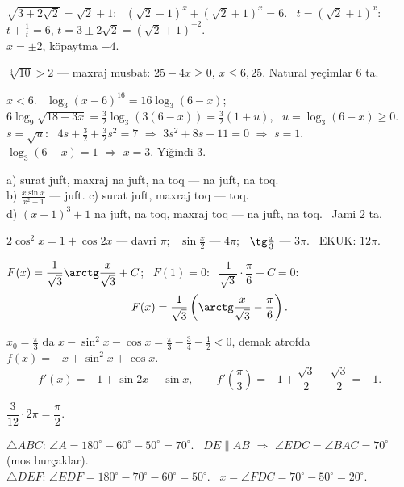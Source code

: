 $\sqrt{3+2\sqrt2}=\sqrt2+1$: \ $\left(\sqrt2-1\right)^x+\left(\sqrt2+1\right)^x=6$. \ $t=\left(\sqrt2+1\right)^x$: $t+\frac1t=6$, $t=3\pm2\sqrt2=\left(\sqrt2+1\right)^{\pm2}$.\\
$x=\pm2$, köpaytma $-4$.

$\sqrt[3]{10}>2$ — maxraj musbat: $25-4x\ge0$, $x\le6{,}25$. Natural yeçimlar $6$ ta.

$x<6$. \ $\log_3(x-6)^{16}=16\log_3(6-x)$; \ $6\log_9\sqrt{18-3x}=\frac32\log_3\left(3(6-x)\right)=\frac32\left(1+u\right)$, \ $u=\log_3(6-x)\ge0$.\\
$s=\sqrt u$: \ $4s+\frac32+\frac32s^2=7$ $\Rightarrow$ $3s^2+8s-11=0$ $\Rightarrow$ $s=1$.\\
$\log_3(6-x)=1$ $\Rightarrow$ $x=3$. Yiğindi $3$.

a) surat juft, maxraj na juft, na toq — na juft, na toq.\\
b) $\frac{x\sin x}{x^2+1}$ — juft. \quad c) surat juft, maxraj toq — toq.\\
d) $(x+1)^3+1$ na juft, na toq, maxraj toq — na juft, na toq. \ Jami $2$ ta.

$2\cos^2x=1+\cos2x$ — davri $\pi$; \ $\sin\frac x2$ — $4\pi$; \ $\tg\frac x3$ — $3\pi$. \ EKUK: $12\pi$.

$F(x)=\dfrac1{\sqrt3}\arctg\dfrac x{\sqrt3}+C$; \ $F(1)=0$: \ $\dfrac1{\sqrt3}\cdot\dfrac\pi6+C=0$:
\[F(x)=\frac1{\sqrt3}\left(\arctg\frac x{\sqrt3}-\frac\pi6\right).\]

$x_0=\frac\pi3$ da $x-\sin^2x-\cos x=\frac\pi3-\frac34-\frac12<0$, demak atrofda $f(x)=-x+\sin^2x+\cos x$.
\[f'(x)=-1+\sin2x-\sin x,\qquad f'\left(\frac\pi3\right)=-1+\frac{\sqrt3}2-\frac{\sqrt3}2=-1.\]

$\dfrac3{12}\cdot2\pi=\dfrac\pi2$.

$\triangle ABC$: $\angle A=180^\circ-60^\circ-50^\circ=70^\circ$. \ $DE\parallel AB$ $\Rightarrow$ $\angle EDC=\angle BAC=70^\circ$ (mos burçaklar).\\
$\triangle DEF$: $\angle EDF=180^\circ-70^\circ-60^\circ=50^\circ$. \ $x=\angle FDC=70^\circ-50^\circ=20^\circ$.

